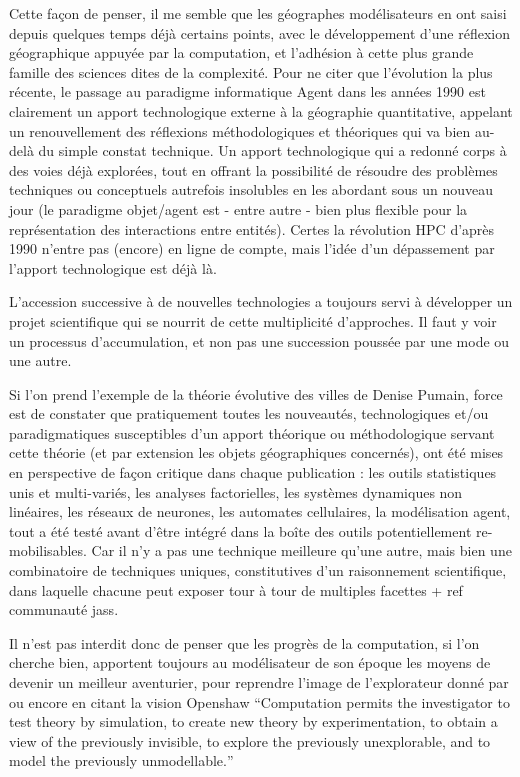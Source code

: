 Cette façon de penser, il me semble que les géographes modélisateurs en ont saisi depuis quelques temps déjà certains points, avec le développement d'une réflexion géographique appuyée par la computation, et l'adhésion à cette plus grande famille des sciences dites de la complexité. Pour ne citer que l'évolution la plus récente, le passage au paradigme informatique Agent dans les années 1990 est clairement un apport technologique externe à la géographie quantitative, appelant un renouvellement des réflexions méthodologiques et théoriques \autocite{Sanders2006} qui va bien au-delà du simple constat technique. Un apport technologique qui a redonné corps à des voies déjà explorées, tout en offrant la possibilité de résoudre des problèmes techniques ou conceptuels autrefois insolubles en les abordant sous un nouveau jour (le paradigme objet/agent est - entre autre - bien plus flexible pour la représentation des interactions entre entités). Certes la révolution HPC d'après 1990 n'entre pas (encore) en ligne de compte, mais l'idée d'un dépassement par l'apport technologique est déjà là.

L'accession successive à de nouvelles technologies a toujours servi à développer un projet scientifique qui se nourrit de cette multiplicité d'approches. Il faut y voir un processus d'accumulation, et non pas une succession poussée par une mode ou une autre.

Si l'on prend l'exemple de la théorie évolutive des villes de Denise Pumain, force est de constater que pratiquement toutes les nouveautés, technologiques et/ou paradigmatiques susceptibles d'un apport théorique ou méthodologique servant cette théorie (et par extension les objets géographiques concernés), ont été mises en perspective de façon critique dans chaque publication : les outils statistiques unis et multi-variés, les analyses factorielles, les systèmes dynamiques non linéaires, les réseaux de neurones, les automates cellulaires, la modélisation agent, tout a été testé avant d'être intégré dans la boîte des outils potentiellement re-mobilisables. Car il n'y a pas une technique meilleure qu'une autre, mais bien une combinatoire de techniques uniques, constitutives d'un raisonnement scientifique, dans laquelle chacune peut exposer tour à tour de multiples facettes  + ref communauté jass.

Il n'est pas interdit donc de penser que les progrès de la computation, si l'on cherche bien, apportent toujours au modélisateur de son époque les moyens de devenir un meilleur aventurier, pour reprendre l'image de l'explorateur donné par \textcite[22]{Banos2013} ou encore en citant la vision Openshaw \foreignquote{english}{Computation permits the investigator to test theory by simulation, to create new theory by experimentation, to obtain a view of the previously invisible, to explore the previously unexplorable, and to model the previously unmodellable.}

